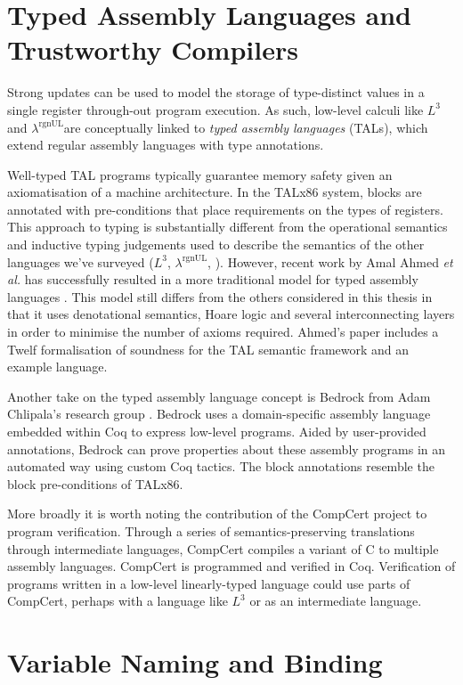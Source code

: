 \documentclass[]{unswthesis}
\newcommand{\rgnUL}{$\lambda^\text{rgnUL}$\text{ }}
\newcommand{\SSPHS}{\text{SSPHS }}
\let\i\textit
\begin{document}
\section{Typed Assembly Languages and Trustworthy Compilers}

Strong updates can be used to model the storage of type-distinct values in a single register through-out program execution. As such, low-level calculi like $L^3$ and \rgnUL are conceptually linked to \i{typed assembly languages} (TALs), which extend regular assembly languages with type annotations.

Well-typed TAL programs typically guarantee memory safety given an axiomatisation of a machine architecture. In the TALx86 \cite{morrisett99, crary99} system, blocks are annotated with pre-conditions that place requirements on the types of registers. This approach to typing is substantially different from the operational semantics and inductive typing judgements used to describe the semantics of the other languages we've surveyed ($L^3$, \rgnUL, \SSPHS). However, recent work by Amal Ahmed \i{et al.}  has successfully resulted in a more traditional model for typed assembly languages \cite{ahmed10}. This model still differs from the others considered in this thesis in that it uses denotational semantics, Hoare logic and several interconnecting layers in order to minimise the number of axioms required. Ahmed's paper includes a Twelf formalisation of soundness for the TAL semantic framework and an example language.

Another take on the typed assembly language concept is Bedrock from Adam Chlipala's research group \cite{chlipala11}. Bedrock uses a domain-specific assembly language embedded within Coq to express low-level programs. Aided by user-provided annotations, Bedrock can prove properties about these assembly programs in an automated way using custom Coq tactics. The block annotations resemble the block pre-conditions of TALx86.

More broadly it is worth noting the contribution of the CompCert \cite{leroy09} project to program verification. Through a series of semantics-preserving translations through intermediate languages, CompCert compiles a variant of C to multiple assembly languages. CompCert is programmed and verified in Coq. Verification of programs written in a low-level linearly-typed language could use parts of CompCert, perhaps with a language like $L^3$ or \SSPHS as an intermediate language.

\section{Variable Naming and Binding}
\label{sec:var-naming}
\end{document}
